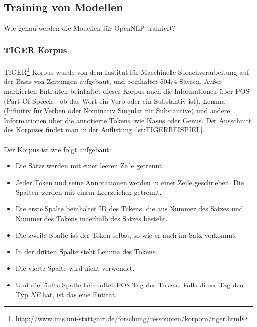 \subsection{Training von Modellen}
Wie genau werden die Modellen für OpenNLP trainiert?

\subsubsection{TIGER Korpus}
\paragraph{}
TIGER\footnote{\url{http://www.ims.uni-stuttgart.de/forschung/ressourcen/korpora/tiger.html}} Korpus wurde von dem Institut für Maschinelle Sprachverarbeitung auf der Basis von Zeitungen aufgebaut, und beinhaltet 50474 Sätzen. Außer markierten Entitäten beinhaltet dieser Korpus auch die Informationen über POS (Part Of Speech - ob das Wort ein Verb oder ein Substantiv ist), Lemma (Infinitiv für Verben oder Nominativ Singular für Substantive) und andere Informationen über die annotierte Tokens, wie Kasus oder Genus. Der Ausschnitt des Korpuses findet man in der Auflistung \ref{lst:TIGERBEISPIEL}.



\paragraph{}
Der Korpus ist wie folgt aufgebaut:
\begin{itemize}
\item Die Sätze werden mit einer leeren Zeile getrennt.
\item Jeder Token und seine Annotationen werden in einer Zeile geschrieben. Die Spalten werden mit einem Leerzeichen getrennt.
\item Die erste Spalte beinhaltet ID des Tokens, die aus Nummer des Satzes und Nummer des Tokens innerhalb des Satzes besteht.
\item Die zweite Spalte ist der Token selbst, so wie er auch im Satz vorkommt.
\item In der dritten Spalte steht Lemma des Tokens.
\item Die vierte Spalte wird nicht verwendet.
\item Und die fünfte Spalte beinhaltet POS-Tag des Tokens. Falls dieser Tag den Typ \textit{NE} hat, ist das eine Entität.
\end{itemize}

